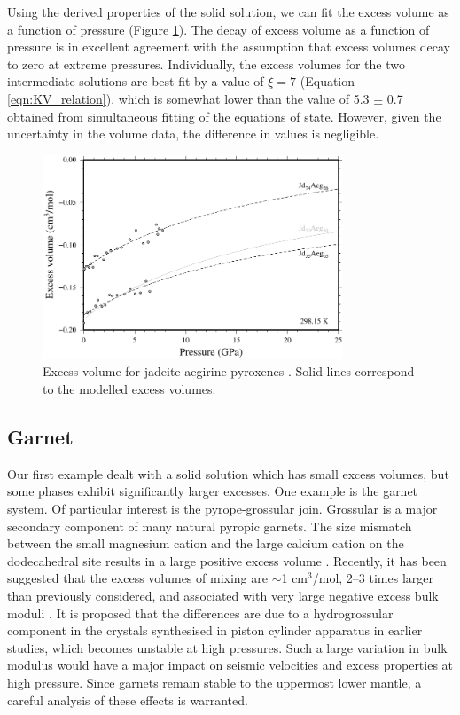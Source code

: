 Using the derived properties of the solid solution, we can fit the excess volume as a function of pressure (Figure \ref{fig:excess_volume_jadeite_aegirine}). The decay of excess volume as a function of pressure is in excellent agreement with the assumption that excess volumes decay to zero at extreme pressures. Individually, the excess volumes for the two intermediate solutions are best fit by a value of $\xi = 7$ (Equation \ref{eqn:KV_relation}), which is somewhat lower than the value of 5.3 $\pm$ 0.7 obtained from simultaneous fitting of the equations of state. However, given the uncertainty in the volume data, the difference in values is negligible.

\begin{figure}[ht!]
  \centering
  \includegraphics[width=0.8\textwidth]{figures/jadeite_aegirine_Vex}
  \caption{Excess volume for jadeite-aegirine pyroxenes \citep{NBLBT2006}. Solid lines correspond to the modelled excess volumes.}
  \label{fig:excess_volume_jadeite_aegirine}
\end{figure}

\subsection{Garnet}
Our first example dealt with a solid solution which has small excess volumes, but some phases exhibit significantly larger excesses. One example is the garnet system. Of particular interest is the pyrope-grossular join. Grossular is a major secondary component of many natural pyropic garnets. The size mismatch between the small magnesium cation and the large calcium cation on the dodecahedral site results in a large positive excess volume \citep{NCK1977, BG1997, GCT1996}. Recently, it has been suggested that the excess volumes of mixing are $\sim$1 cm$^3$/mol, 2--3 times larger than previously considered, and associated with very large negative excess bulk moduli \citep{DCW2015}. It is proposed that the differences are due to a hydrogrossular component in the crystals synthesised in piston cylinder apparatus in earlier studies, which becomes unstable at high pressures. Such a large variation in bulk modulus would have a major impact on seismic velocities and excess properties at high pressure. Since garnets remain stable to the uppermost lower mantle, a careful analysis of these effects is warranted.

